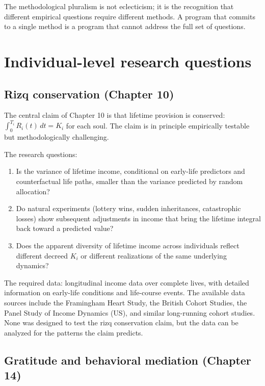 The methodological pluralism is not eclecticism; it is the
recognition that different empirical questions require different
methods. A program that commits to a single method is a program
that cannot address the full set of questions.

\section{Individual-level research questions}
\label{sec:agenda-individual}

\subsection{Rizq conservation (Chapter 10)}

The central claim of Chapter 10 is that lifetime provision is
conserved: $\int_0^{T_i} R_i(t)\, dt = K_i$ for each soul. The
claim is in principle empirically testable but methodologically
challenging.

The research questions:

\begin{enumerate}[leftmargin=2em]
    \item Is the variance of lifetime income, conditional on
    early-life predictors and counterfactual life paths, smaller
    than the variance predicted by random allocation?
    \item Do natural experiments (lottery wins, sudden inheritances,
    catastrophic losses) show subsequent adjustments in income
    that bring the lifetime integral back toward a predicted
    value?
    \item Does the apparent diversity of lifetime income across
    individuals reflect different decreed $K_i$ or different
    realizations of the same underlying dynamics?
\end{enumerate}

The required data: longitudinal income data over complete lives,
with detailed information on early-life conditions and life-course
events. The available data sources include the Framingham Heart
Study, the British Cohort Studies, the Panel Study of Income
Dynamics (US), and similar long-running cohort studies. None was
designed to test the rizq conservation claim, but the data can be
analyzed for the patterns the claim predicts.

\subsection{Gratitude and behavioral mediation (Chapter 14)}


